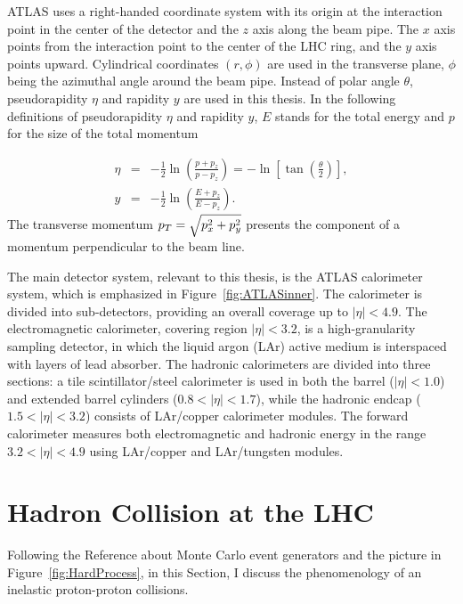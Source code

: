 ATLAS uses a right-handed coordinate system with its origin at the interaction
point in the center of the detector and the $z$ axis along the beam pipe. The
$x$ axis points from the interaction point to the center of the LHC ring, and
the $y$ axis points upward. Cylindrical coordinates $(r, \phi)$ are used in the
transverse plane, $\phi$ being the azimuthal angle around the beam pipe. Instead
of polar angle $\theta$, pseudorapidity $\eta$ and rapidity $y$ are used in this
thesis.  In the following definitions of pseudorapidity $\eta$ and rapidity $y$,
$E$ stands for the total energy and $p$ for the size of the total momentum

\begin{eqnarray}
  \eta &= & - \frac{1}{2} \ln \left( \frac{p+p_z}{p-p_z} \right) = - \ln \left[
  \tan \left( \frac{\theta}{2} \right) \right], \\ y &= &- \frac{1}{2} \ln
  \left( \frac{E+p_z}{E-p_z} \right).	
\end{eqnarray}
The transverse momentum $p_{T} = \sqrt{p_x^2 + p_y^2}$ presents the component of a
momentum perpendicular to the beam line.  

The main detector system, relevant to this thesis, is the ATLAS calorimeter system,
which is emphasized in Figure~\ref{fig:ATLASinner}. The calorimeter is divided
into sub-detectors, providing an overall coverage up to $|\eta| < 4.9$. The
electromagnetic calorimeter, covering region $|\eta| < 3.2$, is a
high-granularity sampling detector, in which the liquid argon (LAr) active medium
is interspaced with layers of lead absorber. The hadronic calorimeters are
divided into three sections: a tile scintillator/steel calorimeter is used in
both the barrel ($|\eta| < 1.0$) and extended barrel cylinders ($0.8 < |\eta| <
1.7$), while the hadronic endcap ($1.5 < |\eta| < 3.2$) consists of LAr/copper
calorimeter modules. The forward calorimeter measures both electromagnetic and
hadronic energy in the range $3.2 < |\eta| < 4.9$ using LAr/copper and
LAr/tungsten modules. 

\section{Hadron Collision at the LHC}

Following the Reference about Monte Carlo event generators \cite{PDG} and the
picture in Figure~\ref{fig:HardProcess}, in this Section, I discuss the
phenomenology of an inelastic proton-proton collisions. 

